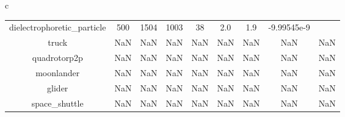 \documentclass{standalone}
\begin{document}
\begin{tabular}{c}
\begin{tabular}{ccccccccc}
  dielectrophoretic\_particle & 500 & 1504 & 1003 & 38 & 2.0 & 1.9 & -9.99545e-9 & \color{red}{Infeasible Problem} \\
  truck & NaN & NaN & NaN & NaN & NaN & NaN & NaN & NaN \\
  quadrotorp2p & NaN & NaN & NaN & NaN & NaN & NaN & NaN & NaN \\
  moonlander & NaN & NaN & NaN & NaN & NaN & NaN & NaN & NaN \\
  glider & NaN & NaN & NaN & NaN & NaN & NaN & NaN & NaN \\
  space\_shuttle & NaN & NaN & NaN & NaN & NaN & NaN & NaN & NaN \\\hline
\end{tabular}
\end{tabular}
\end{document}
